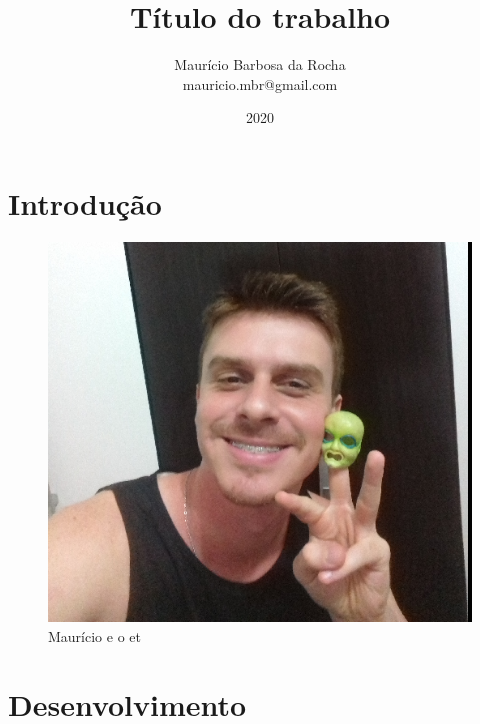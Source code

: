\documentclass[a4paper, 12pt]{article}
\title{ \textbf{Título do trabalho}}
\author{Maurício Barbosa da Rocha \\ mauricio.mbr@gmail.com}
\date{2020}
\begin{document}
 \maketitle  %

 \newpage	

 \tableofcontents \newpage %
 
 \listoffigures \newpage %
 
 \listoftables \newpage %
 

 \section{Introdução}
  \lipsum[10] \lipsum[10]
  
 \begin{figure}[htb]
   \centering
   \includegraphics[scale=0.3]{imagens/eu1.png}
   \caption{Maurício e o et}
   \label{rotulo-figura1}
 \end{figure}

 \section{Desenvolvimento}
  \lipsum[10]
  
\end{document}
